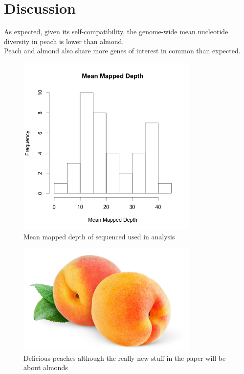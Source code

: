 \documentclass[12pt]{article}
\newcommand{\beginsupplement}{%
        \setcounter{table}{0}
        \renewcommand{\thetable}{S\arabic{table}}%
        \setcounter{figure}{0}
        \renewcommand{\thefigure}{S\arabic{figure}}%
     }
\begin{document}
\section*{Discussion}
As expected, given its self-compatibility, the genome-wide mean nucleotide diversity in peach is lower than almond.
%
\\
Peach and almond also share more genes of interest in common than expected.
%

\pagebreak

%
%
%
\pagebreak
\begin{figure}[b]
\centering
   \includegraphics[width=0.8\textwidth]{depthBQ20MQ30.png}
  \caption{Mean mapped depth of sequenced used in analysis}
  \label{fig:depth}
\end{figure}

\begin{figure}[b]
\centering
   \includegraphics[width=0.8\textwidth]{peachzdfgad.jpg}
  \caption{Delicious peaches although the really new stuff in the paper will be about almonds}
  \label{fig:peach}
\end{figure}
%
\pagebreak
\beginsupplement
\end{document}

